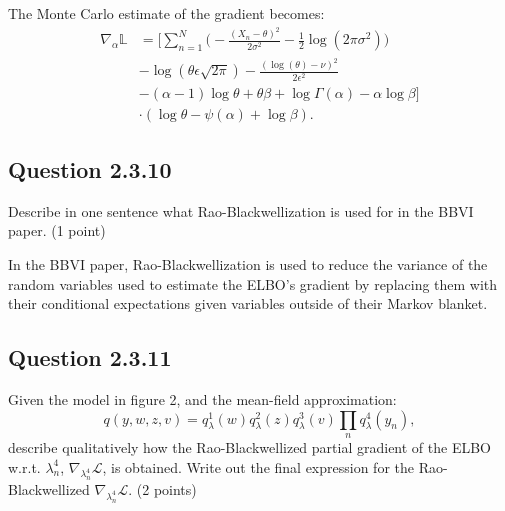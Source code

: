 \documentclass{article}
\begin{document}
\begin{multicols}{2}
The Monte Carlo estimate of the gradient becomes:
\begin{align*}
    \widehat{\nabla_\alpha \mathbb{L}} &= \Bigg[\sum_{n=1}^N \Big(-\frac{(X_n - \theta)^2}{2\sigma^2} - \frac{1}{2} \log(2\pi\sigma^2)\Big) \\&
    - \log(\theta \epsilon \sqrt{2\pi}) - \frac{(\log(\theta) - \nu)^2}{2\epsilon^2} \\
    &- (\alpha - 1)\log \theta + \theta \beta + \log \Gamma(\alpha) - \alpha \log \beta \Bigg]\\& \cdot (\log \theta - \psi(\alpha) + \log \beta).
\end{align*}

\subsection*{Question 2.3.10}
Describe in one sentence what Rao-Blackwellization is used for in the BBVI paper. (1 point)\bigskip 

In the BBVI paper, Rao-Blackwellization is used to reduce the variance of the random variables used to estimate the ELBO's gradient by replacing them with their conditional expectations given variables outside of their Markov blanket.


\subsection*{Question 2.3.11}
Given the model in figure 2, and the mean-field approximation:  
\[
q(y, w, z, v) = q_\lambda^1(w)q_\lambda^2(z)q_\lambda^3(v)\prod_n q_\lambda^4(y_n),
\]
describe qualitatively how the Rao-Blackwellized partial gradient of the ELBO w.r.t. \(\lambda_n^4\), \(\nabla_{\lambda_n^4} \mathcal{L}\), is obtained. Write out the final expression for the Rao-Blackwellized \(\nabla_{\lambda_n^4} \mathcal{L}\). (2 points)







\end{multicols}

\clearpage
{}
\end{document}
